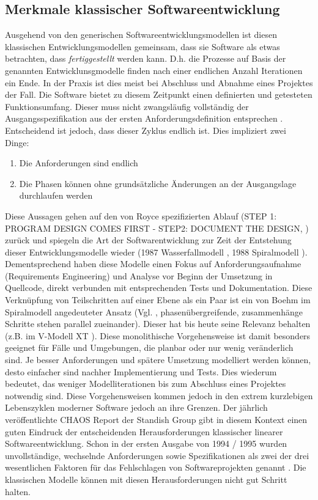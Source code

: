 \subsection{Merkmale klassischer Softwareentwicklung}
\label{Merkmale klassischer Softwareentwicklung}
Ausgehend von den generischen Softwareentwicklungsmodellen ist diesen klassischen Entwicklungsmodellen gemeinsam, dass sie Software als etwas betrachten, dass \textit{fertiggestellt} werden kann. D.h. die Prozesse auf Basis der genannten Entwicklunsgmodelle finden nach einer endlichen Anzahl Iterationen ein Ende. In der Praxis ist dies meist bei Abschluss und Abnahme eines Projektes der Fall. Die Software bietet zu diesem Zeitpunkt einen definierten und getesteten Funktionsumfang. Dieser muss nicht zwangsläufig vollständig der Ausgangsspezifikation aus der ersten Anforderungsdefinition entsprechen \cite[Kap. 9.2]{Manfred_Marko_PM_2013}. Entscheidend ist jedoch, dass dieser Zyklus endlich ist. Dies impliziert zwei Dinge: 
\begin{enumerate}
	\item Die Anforderungen sind endlich
	\item Die Phasen können ohne grundsätzliche Änderungen an der Ausgangslage durchlaufen werden
\end{enumerate}
Diese Aussagen gehen auf den von Royce spezifizierten Ablauf (\glqq{}STEP 1: PROGRAM DESIGN COMES FIRST - STEP2: DOCUMENT THE DESIGN\grqq{}, \cite{royce1987managing}) zurück und spiegeln die Art der Softwarentwicklung zur Zeit der Entstehung dieser Entwicklungsmodelle wieder (1987 Wasserfallmodell \cite{royce1987managing}, 1988 Spiralmodell \cite{boehm_spiral_1988}).
Dementsprechend haben diese Modelle einen Fokus auf Anforderungsaufnahme (\gls{Requirements Engineering}) und Analyse vor Beginn der Umsetzung in Quellcode, direkt verbunden mit entsprechenden Tests und Dokumentation. Diese Verknüpfung von Teilschritten auf einer Ebene als ein Paar ist ein von Boehm im Spiralmodell angedeuteter Ansatz (Vgl. \cite[Abb. 2]{boehm_spiral_1988}, phasenübergreifende, zusammenhänge Schritte stehen parallel zueinander). Dieser hat bis heute seine Relevanz behalten (z.B. im V-Modell XT \cite{noauthor_bundesregierung_nodate}). Diese monolithische Vorgehensweise ist damit besonders geeignet für Fälle und Umgebungen, die planbar oder nur wenig veränderlich sind. Je besser Anforderungen und spätere Umsetzung modelliert werden können, desto einfacher sind nachher Implementierung und Tests. Dies wiederum bedeutet, das weniger Modelliterationen bis zum Abschluss eines Projektes notwendig sind.
Diese Vorgehensweisen kommen jedoch in den extrem kurzlebigen Lebenszyklen moderner Software jedoch an ihre Grenzen. Der jährlich veröffentlichte CHAOS Report der Standish Group gibt in diesem Kontext einen guten Eindruck der entscheidenden Herausforderungen klassischer linearer Softwareentwicklung. Schon in der ersten Ausgabe von 1994 / 1995 \cite{noauthor_standish_1995} wurden unvollständige, wechselnde Anforderungen sowie Spezifikationen als zwei der drei wesentlichen Faktoren für das Fehlschlagen von Softwareprojekten genannt  \cite[S. 4]{noauthor_standish_1995}.
Die klassischen Modelle können mit diesen Herausforderungen nicht gut Schritt halten.